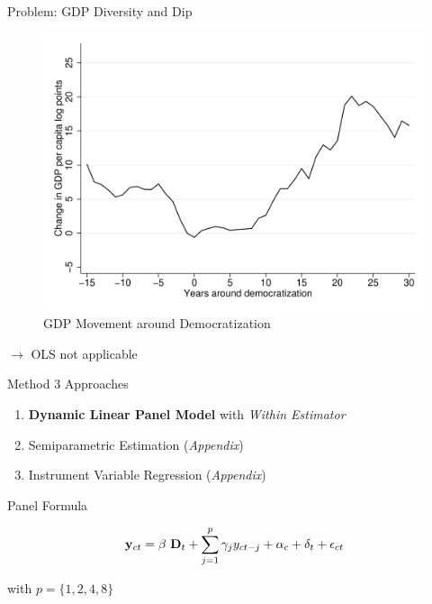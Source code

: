 \documentclass[
  ignorenonframetext,
]{beamer}
\providecommand{\tightlist}{%
  \setlength{\itemsep}{0pt}\setlength{\parskip}{0pt}}\usepackage{longtable,booktabs,array}
\begin{document}
\begin{frame}{Problem: GDP Diversity and Dip}
\protect\hypertarget{problem-gdp-diversity-and-dip}{}
\begin{figure}

{\centering \includegraphics{output/FigureDip.png}

}

\caption{GDP Movement around Democratization}

\end{figure}

\(\to\) OLS not applicable
\end{frame}

\begin{frame}{Method}
\protect\hypertarget{method}{}
3 Approaches

\begin{enumerate}
\tightlist
\item
  \textbf{Dynamic Linear Panel Model} with \emph{Within Estimator}
\item
  Semiparametric Estimation (\emph{Appendix})
\item
  Instrument Variable Regression (\emph{Appendix})
\end{enumerate}

Panel Formula

\[
\bold{y}_{ct} = \beta \ \bold{D}_t + \sum_{j=1}^p \gamma_j y_{ct-j} + \alpha_c + \delta_t + \epsilon_{ct}
\]

with \(p = \{1,2,4,8\}\)
\end{frame}
\end{document}
